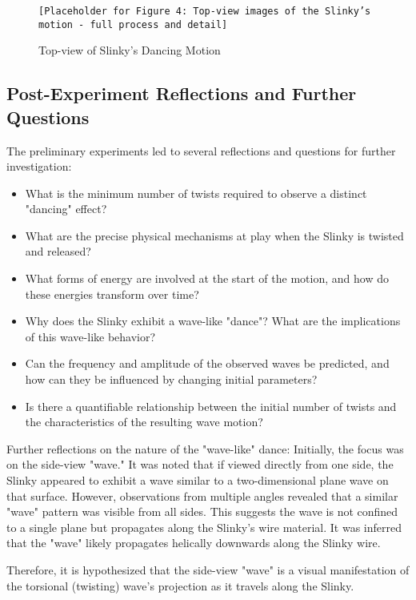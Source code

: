 \documentclass{mcmthesis}  %
\begin{document}
\begin{figure}[h!]
    \centering
    \texttt{[Placeholder for Figure 4: Top-view images of the Slinky's motion - full process and detail]}
    \caption{Top-view of Slinky's Dancing Motion}
    \label{fig:top_view_phenomena}
\end{figure}

\subsection{Post-Experiment Reflections and Further Questions} %
The preliminary experiments led to several reflections and questions for further investigation:
\begin{itemize}
    \item What is the minimum number of twists required to observe a distinct "dancing" effect?
    \item What are the precise physical mechanisms at play when the Slinky is twisted and released?
    \item What forms of energy are involved at the start of the motion, and how do these energies transform over time?
    \item Why does the Slinky exhibit a wave-like "dance"? What are the implications of this wave-like behavior?
    \item Can the frequency and amplitude of the observed waves be predicted, and how can they be influenced by changing initial parameters?
    \item Is there a quantifiable relationship between the initial number of twists and the characteristics of the resulting wave motion?
\end{itemize}

Further reflections on the nature of the "wave-like" dance:
Initially, the focus was on the side-view "wave." It was noted that if viewed directly from one side, the Slinky appeared to exhibit a wave similar to a two-dimensional plane wave on that surface. However, observations from multiple angles revealed that a similar "wave" pattern was visible from all sides. This suggests the wave is not confined to a single plane but propagates along the Slinky's wire material. It was inferred that the "wave" likely propagates helically downwards along the Slinky wire.

Therefore, it is hypothesized that the side-view "wave" is a visual manifestation of the torsional (twisting) wave's projection as it travels along the Slinky.
\end{document}
